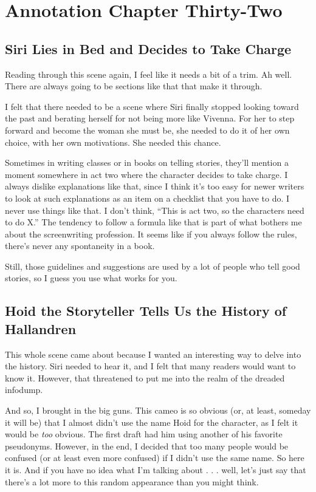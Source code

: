 \section{Annotation Chapter Thirty-Two}

\subsection*{Siri Lies in Bed and Decides to Take Charge}

Reading through this scene again, I feel like it needs a bit of a trim. Ah well. There are always going to be sections like that that make it through.

I felt that there needed to be a scene where Siri finally stopped looking toward the past and berating herself for not being more like Vivenna. For her to step forward and become the woman she must be, she needed to do it of her own choice, with her own motivations. She needed this chance.

Sometimes in writing classes or in books on telling stories, they’ll mention a moment somewhere in act two where the character decides to take charge. I always dislike explanations like that, since I think it’s too easy for newer writers to look at such explanations as an item on a checklist that you have to do. I never use things like that. I don’t think, “This is act two, so the characters need to do X.” The tendency to follow a formula like that is part of what bothers me about the screenwriting profession. It seems like if you always follow the rules, there’s never any spontaneity in a book.

Still, those guidelines and suggestions are used by a lot of people who tell good stories, so I guess you use what works for you.

\subsection*{Hoid the Storyteller Tells Us the History of Hallandren}

This whole scene came about because I wanted an interesting way to delve into the history. Siri needed to hear it, and I felt that many readers would want to know it. However, that threatened to put me into the realm of the dreaded infodump.

And so, I brought in the big guns. This cameo is so obvious (or, at least, someday it will be) that I almost didn’t use the name Hoid for the character, as I felt it would be \textit{too} obvious. The first draft had him using another of his favorite pseudonyms. However, in the end, I decided that too many people would be confused (or at least even more confused) if I didn’t use the same name. So here it is. And if you have no idea what I’m talking about . . . well, let’s just say that there’s a lot more to this random appearance than you might think.

